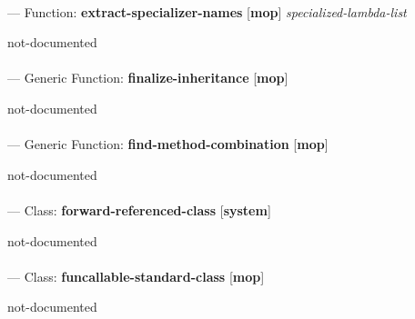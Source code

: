 \paragraph{}
\label{MOP:EXTRACT-SPECIALIZER-NAMES}
--- Function: \textbf{extract-specializer-names} [\textbf{mop}] \textit{specialized-lambda-list}

\begin{adjustwidth}{5em}{5em}
not-documented
\end{adjustwidth}

\paragraph{}
\label{MOP:FINALIZE-INHERITANCE}
--- Generic Function: \textbf{finalize-inheritance} [\textbf{mop}] \textit{}

\begin{adjustwidth}{5em}{5em}
not-documented
\end{adjustwidth}

\paragraph{}
\label{MOP:FIND-METHOD-COMBINATION}
--- Generic Function: \textbf{find-method-combination} [\textbf{mop}] \textit{}

\begin{adjustwidth}{5em}{5em}
not-documented
\end{adjustwidth}

\paragraph{}
\label{SYSTEM:FORWARD-REFERENCED-CLASS}
--- Class: \textbf{forward-referenced-class} [\textbf{system}] \textit{}

\begin{adjustwidth}{5em}{5em}
not-documented
\end{adjustwidth}

\paragraph{}
\label{MOP:FUNCALLABLE-STANDARD-CLASS}
--- Class: \textbf{funcallable-standard-class} [\textbf{mop}] \textit{}

\begin{adjustwidth}{5em}{5em}
not-documented
\end{adjustwidth}

